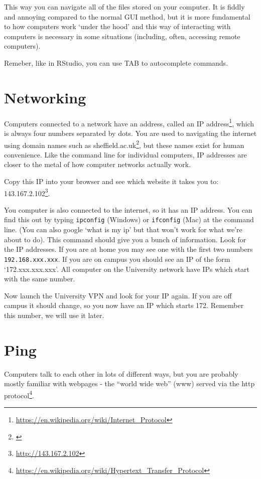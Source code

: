 \documentclass[
  12pt,
  a5paper,
]{book}
\DeclareRobustCommand{\href}[2]{#2\footnote{\url{#1}}}
\begin{document}
This way you can navigate all of the files stored on your computer. It is fiddly and annoying compared to the normal GUI method, but it is more fundamental to how computers work `under the hood' and this way of interacting with computers is necessary in some situations (including, often, accessing remote computers).

Remeber, like in RStudio, you can use TAB to autocomplete commands.

\hypertarget{networking}{%
\section{Networking}\label{networking}}

Computers connected to a network have an address, called an \href{https://en.wikipedia.org/wiki/Internet_Protocol}{IP address}, which is always four numbers separated by dots. You are used to navigating the internet using domain names such as \href{}{sheffield.ac.uk}, but these names exist for human convenience. Like the command line for individual computers, IP addresses are closer to the metal of how computer networks actually work.

Copy this IP into your browser and see which website it takes you to: \href{http://143.167.2.102}{143.167.2.102}.

You computer is also connected to the internet, so it has an IP address. You can find this out by typing \texttt{ipconfig} (Windows) or \texttt{ifconfig} (Mac) at the command line. (You can also google `what is my ip' but that won't work for what we're about to do). This command should give you a bunch of information. Look for the IP addresses. If you are at home you may see one with the first two numbers \texttt{192.168.xxx.xxx}. If you are on campus you should see an IP of the form `172.xxx.xxx.xxx'. All computer on the University network have IPs which start with the same number.

Now launch the University VPN and look for your IP again. If you are off campus it should change, so you now have an IP which starts 172. Remember this number, we will use it later.

\hypertarget{ping}{%
\section{Ping}\label{ping}}

Computers talk to each other in lots of different ways, but you are probably mostly familiar with webpages - the ``world wide web'' (www) served via the \href{https://en.wikipedia.org/wiki/Hypertext_Transfer_Protocol}{http protocol}.
\end{document}
